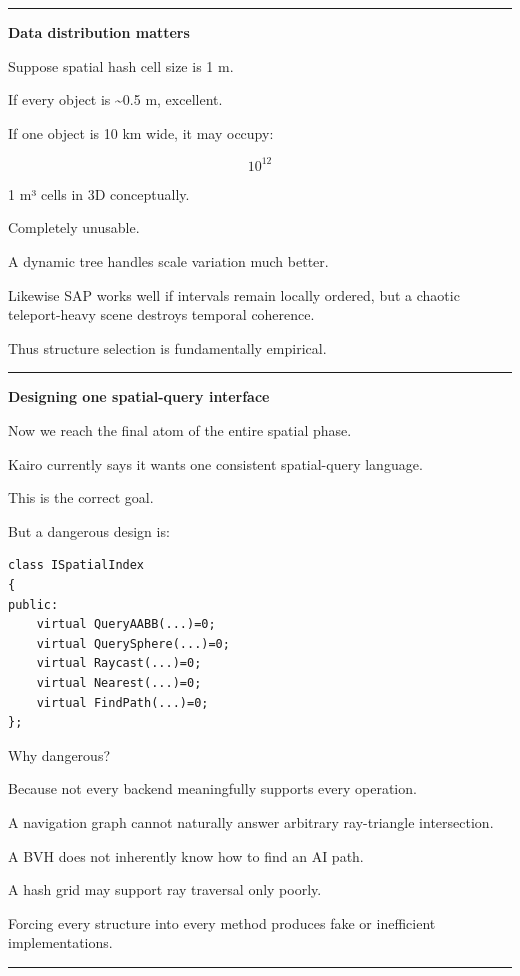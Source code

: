\begin{center}\rule{0.5\linewidth}{0.5pt}\end{center}

\textbf{Data distribution matters}

Suppose spatial hash cell size is 1 m.

If every object is \textasciitilde0.5 m, excellent.

If one object is 10 km wide, it may occupy:

\[
10^{12}
\]

1 m³ cells in 3D conceptually.

Completely unusable.

A dynamic tree handles scale variation much better.

Likewise SAP works well if intervals remain locally ordered, but a chaotic teleport-heavy scene destroys temporal coherence.

Thus structure selection is fundamentally empirical.

\begin{center}\rule{0.5\linewidth}{0.5pt}\end{center}

\textbf{Designing one spatial-query interface}

Now we reach the final atom of the entire spatial phase.

Kairo currently says it wants one consistent spatial-query language.

This is the correct goal.

But a dangerous design is:

\begin{verbatim}
class ISpatialIndex
{
public:
    virtual QueryAABB(...)=0;
    virtual QuerySphere(...)=0;
    virtual Raycast(...)=0;
    virtual Nearest(...)=0;
    virtual FindPath(...)=0;
};
\end{verbatim}

Why dangerous?

Because not every backend meaningfully supports every operation.

A navigation graph cannot naturally answer arbitrary ray-triangle intersection.

A BVH does not inherently know how to find an AI path.

A hash grid may support ray traversal only poorly.

Forcing every structure into every method produces fake or inefficient implementations.

\begin{center}\rule{0.5\linewidth}{0.5pt}\end{center}

